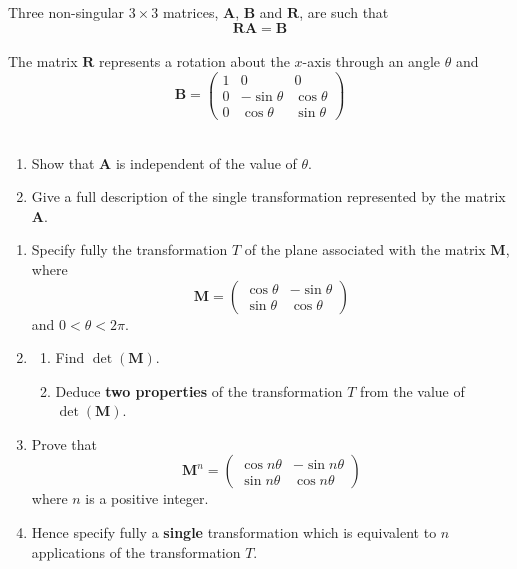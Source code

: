 \documentclass[leqno]{article}
\begin{document}
\begin{enumerate}[
  label=\textbf{\arabic*.},
  leftmargin=*,
  topsep=0pt,
  partopsep=0pt,
  parsep=0pt
]
Three non-singular $3 \times 3$ matrices, $\mathbf{A}$, $\mathbf{B}$ and $\mathbf{R}$, are such that
\[
\mathbf{R}\mathbf{A}=\mathbf{B}
\] \\
The matrix $\mathbf{R}$ represents a rotation about the $x$-axis through an angle $\theta$ and
\[
\mathbf{B}=\begin{pmatrix}
1 & 0 & 0 \\
0 & -\sin\theta & \cos\theta \\
0 & \cos\theta & \sin\theta
\end{pmatrix}
\] \\
\begin{enumerate}[label=\textbf{(\alph*)}]
  \item Show that $\mathbf{A}$ is independent of the value of $\theta$.  \\
  \item Give a full description of the single transformation represented by the matrix $\mathbf{A}$.  \\
\end{enumerate}

\newpage

\questionitem

\begin{enumerate}[label=\textbf{(\alph*)}]
  \item Specify fully the transformation $T$ of the plane associated with the matrix $\mathbf{M}$, where
  \[
  \mathbf{M} = \begin{pmatrix} \cos\theta & -\sin\theta \\ \sin\theta & \cos\theta \end{pmatrix}
  \]
  and $0<\theta<2\pi$.  \\
  \item
  \begin{enumerate}[label=(\roman*)]
    \item Find $\det(\mathbf{M})$. 
    \item Deduce \textbf{two properties} of the transformation $T$ from the value of $\det(\mathbf{M})$.  \\
  \end{enumerate}
  \item Prove that
  \[
  \mathbf{M}^n = \begin{pmatrix} \cos n\theta & -\sin n\theta \\ \sin n\theta & \cos n\theta \end{pmatrix}
  \]
  where $n$ is a positive integer.  \\
  
  \item Hence specify fully a \textbf{single} transformation which is equivalent to $n$ applications of the transformation $T$.  \\
\end{enumerate}
\end{enumerate}
\end{document}
